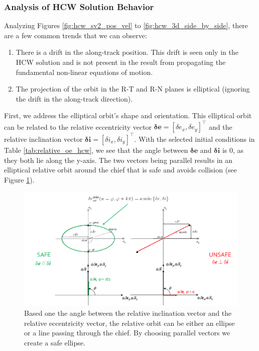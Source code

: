 \subsubsection{Analysis of HCW Solution Behavior}\label{sec:analysis_of_hcw}
Analyzing Figures \ref{fig:hcw_sv2_pos_vel}
to \ref{fig:hcw_3d_side_by_side}, there are a few common trends that we can observe:
\begin{enumerate}
    \item There is a drift in the along-track position. This drift is seen only in the HCW solution and is not present in the result from propagating the fundamental non-linear equations of motion.
    \item The projection of the orbit in the R-T and R-N planes is elliptical (ignoring the drift in the along-track direction).
\end{enumerate}

First, we address the elliptical orbit's shape and orientation. This elliptical orbit can be related to the relative eccentricity vector $\boldsymbol{\delta e} = [\delta e_x, \delta e_y]^\top$ and the relative inclination vector $\boldsymbol{\delta i} = [\delta i_x, \delta i_y]^\top$. With the selected initial conditions in Table \ref{tab:relative_oe_hcw}, we see that the angle between $\boldsymbol{\delta e}$ and $\boldsymbol{\delta i}$ is $0$, as they both lie along the y-axis. The two vectors being parallel results in an elliptical relative orbit around the chief that is safe and avoids collision (see Figure \ref{fig:relative_orbit_geometry}).

\begin{figure}[htpb]
    \centering
    \includegraphics[width=0.75\linewidth]{LaTeX//PS3/relative_orbit_geometry.png}
    \caption{Based one the angle between the relative inclination vector and the relative eccentricity vector, the relative orbit can be either an ellipse or a line passing through the chief. By choosing parallel vectors we create a safe ellipse.}
    \label{fig:relative_orbit_geometry}
\end{figure}

